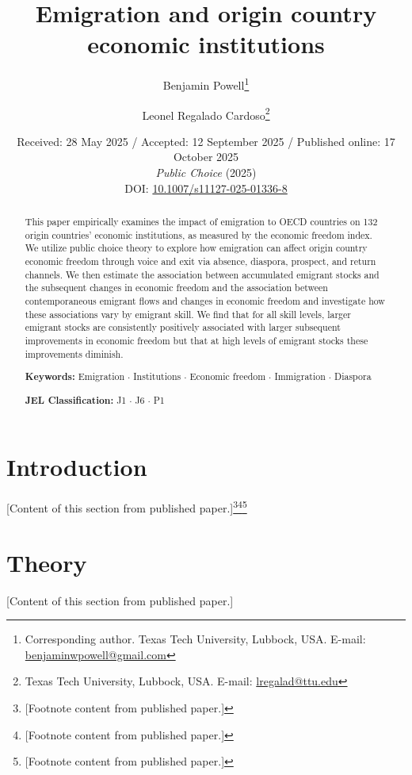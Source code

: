 \documentclass[12pt]{article}
\title{Emigration and origin country economic institutions}
\author{Benjamin Powell\thanks{Corresponding author. Texas Tech University, Lubbock, USA. E-mail: \href{mailto:benjaminwpowell@gmail.com}{benjaminwpowell@gmail.com}} \and Leonel Regalado Cardoso\thanks{Texas Tech University, Lubbock, USA. E-mail: \href{mailto:lregalad@ttu.edu}{lregalad@ttu.edu}}}
\date{
    Received: 28 May 2025 / Accepted: 12 September 2025 / Published online: 17 October 2025\\[6pt]
    \textit{Public Choice} (2025)\\[3pt]
    DOI: \href{https://doi.org/10.1007/s11127-025-01336-8}{10.1007/s11127-025-01336-8}
}
\begin{document}
\maketitle

\begin{abstract}
This paper empirically examines the impact of emigration to OECD countries on 132 origin countries' economic institutions, as measured by the economic freedom index. We utilize public choice theory to explore how emigration can affect origin country economic freedom through voice and exit via absence, diaspora, prospect, and return channels. We then estimate the association between accumulated emigrant stocks and the subsequent changes in economic freedom and the association between contemporaneous emigrant flows and changes in economic freedom and investigate how these associations vary by emigrant skill. We find that for all skill levels, larger emigrant stocks are consistently positively associated with larger subsequent improvements in economic freedom but that at high levels of emigrant stocks these improvements diminish.

\medskip
\noindent \textbf{Keywords:} Emigration $\cdot$ Institutions $\cdot$ Economic freedom $\cdot$ Immigration $\cdot$ Diaspora

\medskip
\noindent \textbf{JEL Classification:} J1 $\cdot$ J6 $\cdot$ P1
\end{abstract}

\newpage
\doublespacing

\section{Introduction}
\label{sec:introduction}

[Content of this section from published paper.]\footnote{[Footnote content from published paper.]}\footnote{[Footnote content from published paper.]}\footnote{[Footnote content from published paper.]}

\section{Theory}
\label{sec:theory}

[Content of this section from published paper.]
\end{document}
